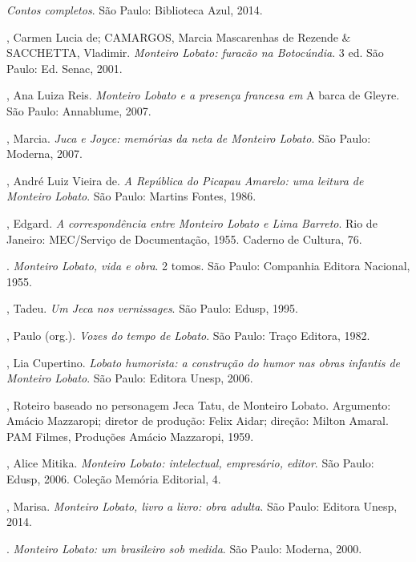 \emph{Contos completos}. São Paulo: Biblioteca Azul, 2014.


\begin{bibliohedra}
, Carmen Lucia de; CAMARGOS, Marcia Mascarenhas de Rezende \&
SACCHETTA, Vladimir. \emph{Monteiro Lobato: furacão na Botocúndia}. 3
ed. São Paulo: Ed. Senac, 2001.

, Ana Luiza Reis. \emph{Monteiro Lobato e a presença francesa em} A
barca de Gleyre. São Paulo: Annablume, 2007.

, Marcia. \emph{Juca e Joyce: memórias da neta de Monteiro
Lobato}. São Paulo: Moderna, 2007.

, André Luiz Vieira de. \emph{A República do Picapau Amarelo: uma
leitura de Monteiro Lobato}. São Paulo: Martins Fontes, 1986.

, Edgard. \emph{A correspondência entre Monteiro Lobato e Lima
Barreto}. Rio de Janeiro: MEC/Serviço de Documentação, 1955. Caderno de
Cultura, 76.

\titidem. \emph{Monteiro Lobato, vida e obra}. 2 tomos. São
Paulo: Companhia Editora Nacional, 1955.

, Tadeu. \emph{Um Jeca nos vernissages}. São Paulo: Edusp,
1995.

, Paulo (org.). \emph{Vozes do tempo de Lobato}. São Paulo: Traço
Editora, 1982.

, Lia Cupertino. \emph{Lobato humorista: a construção do humor nas
obras infantis de Monteiro Lobato}. São Paulo: Editora Unesp, 2006.

, Roteiro baseado no personagem Jeca Tatu, de Monteiro
Lobato. Argumento: Amácio Mazzaropi; diretor de produção: Felix Aidar;
direção: Milton Amaral. PAM Filmes, Produções Amácio Mazzaropi, 1959.

, Alice Mitika. \emph{Monteiro Lobato: intelectual, empresário,
editor}. São Paulo: Edusp, 2006. Coleção Memória Editorial, 4.

, Marisa. \emph{Monteiro Lobato, livro a livro: obra adulta}. São
Paulo: Editora Unesp, 2014.

\titidem. \emph{Monteiro Lobato: um brasileiro sob medida}. São
Paulo: Moderna, 2000.


\end{bibliohedra}
